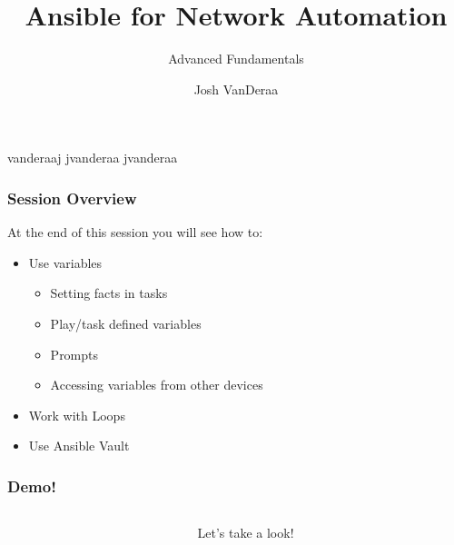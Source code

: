 \documentclass[aspectratio=169]{beamer}
\title{Ansible for Network Automation}
\subtitle{Advanced Fundamentals}
\date{}
\author{Josh VanDeraa}
\begin{document}
\begin{frame}
  \maketitle
  \footnotesize
  \faTwitter vanderaaj \hfill \faGithub jvanderaa \hfill \faSlack jvanderaa
\end{frame}

\begin{frame}
  \frametitle{Session Overview}
  At the end of this session you will see how to:
  \begin{itemize}
    \item <2-> Use variables
    \begin{itemize}
      \item <2-> Setting facts in tasks
      \item <3-> Play/task defined variables
      \item <4-> Prompts
      \item <5-> Accessing variables from other devices
    \end{itemize}
    \item <6-> Work with Loops
    \item <7-> Use Ansible Vault
  \end{itemize}
\end{frame}

\begin{frame}
  \frametitle{Demo!}
  \begin{columns}
    \begin{column}{0.3\textwidth}
      \Huge
      \begin{center}
        \faDesktop 
        \hspace{.5cm}
        \faRocket     
      \end{center}
    \end{column}
    \begin{column}{0.7\textwidth}
      \huge 
      Let's take a look!
    \end{column}
  \end{columns}
\end{frame}
\end{document}
